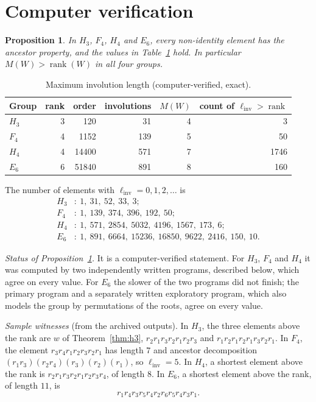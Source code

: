 \documentclass[11pt]{amsart}
\newtheorem{proposition}[theorem]{Proposition}
\theoremstyle{definition}\newtheorem{definition}[theorem]{Definition}
\theoremstyle{remark}\newtheorem{remark}[theorem]{Remark}
\newcommand{\linv}{\ell_{\mathrm{inv}}}
\DeclareMathOperator{\rank}{rank}
\begin{document}
\section{Computer verification}\label{sec:computer}

\begin{proposition}\label{prop:maxima}
In \(H_3\), \(F_4\), \(H_4\) and \(E_6\), every non-identity element has the ancestor property, and the values in Table~\ref{tab:maxima} hold. In particular \(M(W)>\rank(W)\) in all four groups.
\end{proposition}

\begin{table}[ht]
\small
\caption{Maximum involution length (computer-verified, exact).}\label{tab:maxima}
\begin{tabular}{@{}lrrrrr@{}}
\toprule
Group & rank & order & involutions & \(M(W)\) & count of \(\linv>\rank\) \\
\midrule
\(H_3\) & 3 & 120 & 31 & 4 & 3 \\
\(F_4\) & 4 & 1152 & 139 & 5 & 50 \\
\(H_4\) & 4 & 14400 & 571 & 7 & 1746 \\
\(E_6\) & 6 & 51840 & 891 & 8 & 160 \\
\bottomrule
\end{tabular}
\end{table}

The number of elements with \(\linv=0,1,2,\dots\) is
\begin{align*}
H_3&:\ 1,\ 31,\ 52,\ 33,\ 3;\\
F_4&:\ 1,\ 139,\ 374,\ 396,\ 192,\ 50;\\
H_4&:\ 1,\ 571,\ 2854,\ 5032,\ 4196,\ 1567,\ 173,\ 6;\\
E_6&:\ 1,\ 891,\ 6664,\ 15236,\ 16850,\ 9622,\ 2416,\ 150,\ 10.
\end{align*}

\emph{Status of Proposition~\ref{prop:maxima}.} It is a computer-verified statement. For \(H_3\), \(F_4\) and \(H_4\) it was computed by two independently written programs, described below, which agree on every value. For \(E_6\) the slower of the two programs did not finish; the primary program and a separately written exploratory program, which also models the group by permutations of the roots, agree on every value.

\emph{Sample witnesses} (from the archived outputs). In \(H_3\), the three elements above the rank are \(w\) of Theorem~\ref{thm:h3}, \(r_2r_1r_3r_2r_1r_2r_3\) and \(r_1r_2r_1r_2r_1r_3r_2r_1\). In \(F_4\), the element \(r_3r_4r_1r_2r_3r_2r_1\) has length \(7\) and ancestor decomposition \((r_1r_3)(r_2r_4)(r_3)(r_2)(r_1)\), so \(\linv=5\). In \(H_4\), a shortest element above the rank is \(r_2r_1r_3r_2r_1r_2r_3r_4\), of length \(8\). In \(E_6\), a shortest element above the rank, of length \(11\), is
\[
r_1r_4r_3r_5r_4r_2r_6r_5r_4r_3r_1.
\]
\end{document}
